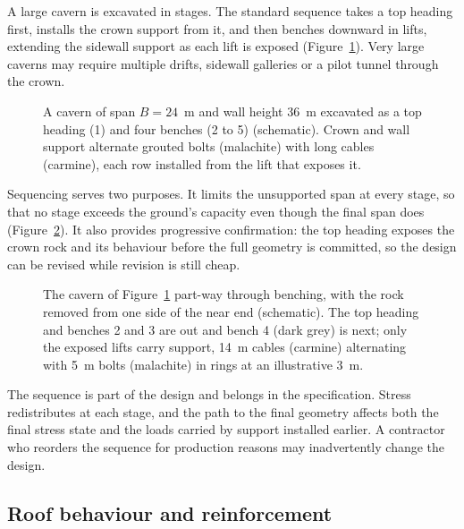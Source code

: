 A large cavern is excavated in stages. The standard sequence takes
a top heading first, installs the crown support from it, and then benches
downward in lifts, extending the sidewall support as each lift is exposed
(Figure~\ref{fig:cavern-sequence}).
Very large caverns may require multiple drifts, sidewall galleries or a pilot
tunnel through the crown.

\begin{figure}[htbp]
\centering
{}
\caption{A cavern of span $B = 24$~m and wall height 36~m excavated as a top heading (1) and four benches (2 to 5) (schematic). Crown and wall support alternate grouted bolts (malachite) with long cables (carmine), each row installed from the lift that exposes it.}
\label{fig:cavern-sequence}
\end{figure}

Sequencing serves two purposes. It limits the unsupported span at every stage,
so that no stage exceeds the ground's capacity even though the final span
does (Figure~\ref{fig:r3d-cavern-sequence}). It also provides progressive confirmation: the top heading exposes the
crown rock and its behaviour before the full geometry is committed, so the
design can be revised while revision is still cheap.

\begin{figure}[htbp]
\centering
{}
\caption{The cavern of Figure~\ref{fig:cavern-sequence} part-way through benching, with the rock removed from one side of the near end (schematic). The top heading and benches 2 and 3 are out and bench 4 (dark grey) is next; only the exposed lifts carry support, 14~m cables (carmine) alternating with 5~m bolts (malachite) in rings at an illustrative 3~m.}
\label{fig:r3d-cavern-sequence}
\end{figure}

The sequence is part of the design and belongs in the specification. Stress
redistributes at each stage, and the path to the final geometry affects both
the final stress state and the loads carried by support installed earlier.
A contractor who reorders the sequence for production reasons may
inadvertently change the design.

\subsection{Roof behaviour and reinforcement}
\label{sec:cavern-roof-reinforcement}

